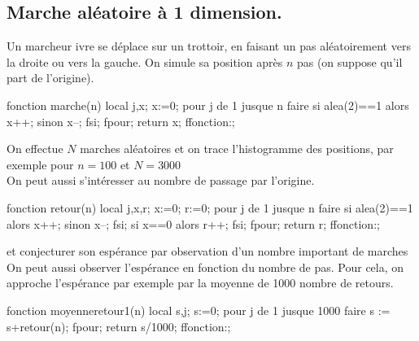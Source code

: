 \documentclass[12pt,a4paper]{book}
\begin{document}
\begin{giacjshere}
\section{Marche al\'eatoire \`a 1 dimension.}
Un marcheur ivre se d\'eplace sur un trottoir, en faisant
un pas al\'eatoirement vers la droite ou vers la gauche.
On simule sa position apr\`es $n$ pas (on suppose qu'il part de l'origine).
\begin{giaconload}
fonction marche(n)
  local j,x;
  x:=0;
  pour j de 1 jusque n faire
    si alea(2)==1 alors x++; sinon x--; fsi;
  fpour;
  return x;
ffonction:;
\end{giaconload}
On effectue $N$ marches al\'eatoires et on trace l'histogramme des
positions, par exemple pour $n=100$ et $N=3000$\\
On peut aussi s'int\'eresser au nombre de passage par l'origine.
\begin{giaconload}
fonction retour(n)
  local j,x,r;
  x:=0; r:=0;
  pour j de 1 jusque n faire
    si alea(2)==1 alors x++; sinon x--; fsi;
    si x==0 alors r++; fsi;
  fpour;
  return r;
ffonction:;
\end{giaconload}
et conjecturer son esp\'erance par observation d'un nombre important
de marches\\
On peut aussi observer l'esp\'erance en fonction du nombre de pas.
Pour cela, on approche l'esp\'erance par exemple par la moyenne de
1000 nombre de retours.
\begin{giaconload}
fonction moyenneretour1(n)
  local s,j;
  s:=0;
  pour j de 1 jusque 1000 faire
    s := s+retour(n);
  fpour;
  return s/1000;
ffonction:;
\end{giaconload}


\end{giacjshere}
\end{document}

